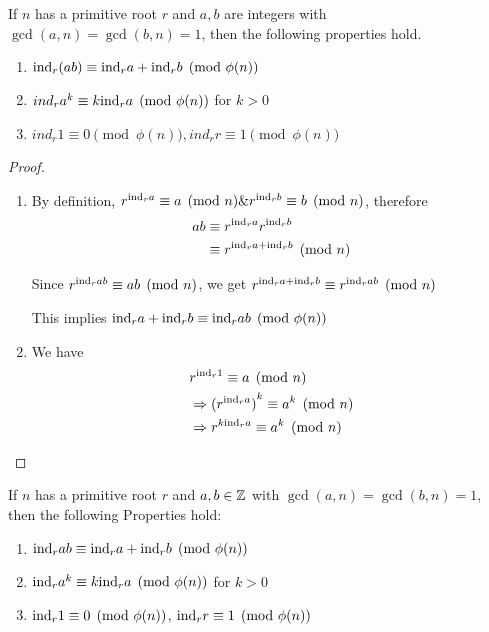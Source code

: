 \begin{theorem}
    If $n$ has a primitive root $r$ and $a, b$ are integers with \newline
    $\gcd(a, n) = \gcd(b, n) = 1$, then the following properties hold.

    \begin{enumerate}
        \item $\text{ind}_r(ab) \equiv \text{ind}_r a + \text{ind}_r b \pmod{\phi(n)}$
        \item $ind_r a^k \equiv k \text{ind}_r a \pmod{\phi(n)}$ for $k > 0$
        \item $ind_r 1 \equiv 0 \pmod{\phi(n)}, ind_r r \equiv 1 \pmod{\phi(n)}$
    \end{enumerate}
\end{theorem}
\begin{proof}
    \begin{enumerate}
        \item By definition, $r^{\text{ind}_r a} \equiv a \pmod n \& r^{\text{ind}_r b} \equiv b \pmod n$,
        therefore
        \[
            \begin{aligned}
                ab &\equiv r^{\text{ind}_r a} r^{\text{ind}_r b} \\
                &\equiv r^{\text{ind}_r a + \text{ind}_r b} \pmod n
            \end{aligned}
        \]

        Since $r^{\text{ind}_r ab} \equiv ab \pmod n$, we get $r^{\text{ind}_r a + \text{ind}_r b} \equiv r^{\text{ind}_r ab} \pmod n$

        This implies $\text{ind}_r a + \text{ind}_r b \equiv \text{ind}_r ab \pmod{\phi(n)}$

        \item We have 
        \[
            \begin{aligned}
                &r^{\text{ind}_r 1} \equiv a \pmod n\\
                &\Rightarrow {(r^{\text{ind}_r a})}^k \equiv a^k \pmod n\\
                &\Rightarrow r^{k\text{ind}_r a} \equiv a^k \pmod n\\
            \end{aligned}
        \]
    \end{enumerate}
\end{proof}

\begin{theorem}
    If $n$ has a primitive root $r$ and $a, b \in \mathbb{Z}$
    with $\gcd(a, n) = \gcd(b, n) = 1$, then the following Properties hold:
    \begin{enumerate}
        \item $\text{ind}_r ab \equiv \text{ind}_r a + \text{ind}_r b \pmod {\phi(n)}$
        \item $\text{ind}_r a^k \equiv k \text{ind}_r a \pmod {\phi(n)}$ for $k > 0$
        \item $\text{ind}_r 1 \equiv 0 \pmod {\phi(n)}$, $\text{ind}_r r \equiv 1 \pmod {\phi(n)}$
    \end{enumerate}
\end{theorem}

